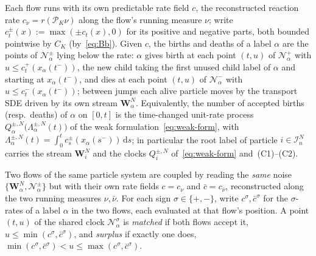 \documentclass[a4paper,fleqn]{cas-sc}
\theoremstyle{definition}
\theoremstyle{remark}
\begin{document}
Each flow runs with its own predictable rate field $c$, the reconstructed reaction rate
$c_\nu=r(\mathcal P_K\nu)$ along the flow's running measure $\nu$; write
$c^\pm_t(x):=\max(\pm c_t(x),0)$ for its positive and negative parts, both bounded
pointwise by $C_K$ (by~\eqref{eq:Bb}). Given $c$, the births and deaths of a label
$\alpha$ are the points of $\mathcal N^\pm_\alpha$ lying below the rate: $\alpha$ gives
birth at each point $(t,u)$ of $\mathcal N^{+}_\alpha$ with $u\le c^+_t(x_\alpha(t^-))$,
the new child taking the first unused child label of $\alpha$ and starting at
$x_\alpha(t^-)$, and dies at each point $(t,u)$ of $\mathcal N^{-}_\alpha$ with
$u\le c^-_t(x_\alpha(t^-))$; between jumps each alive particle moves by the transport SDE
driven by its own stream $\mathbf W^N_\alpha$. Equivalently, the number of accepted
births (resp.\ deaths) of $\alpha$ on $[0,t]$ is the time-changed unit-rate process
$Q^{\pm,N}_\alpha\!\bigl(\Lambda^{\pm,N}_\alpha(t)\bigr)$ of the weak
formulation~\eqref{eq:weak-form}, with
$\Lambda^{\pm,N}_\alpha(t)=\int_0^t c^\pm_s(x_\alpha(s^-))\,\mathrm ds$; in particular the
root label of particle $i\in\mathcal I^N_n$ carries the stream $\mathbf W^N_i$ and the
clocks $Q^{\pm,N}_i$ of~\eqref{eq:weak-form} and~(C1)--(C2).

Two flows of the same particle system are coupled by reading the \emph{same} noise
$\{\mathbf W^N_\alpha,\mathcal N^\pm_\alpha\}$ but with their own rate fields $c=c_\nu$ and
$\bar c=c_{\bar\nu}$, reconstructed along the two running measures $\nu,\bar\nu$. For each
sign $\sigma\in\{+,-\}$, write $c^\sigma,\bar c^\sigma$ for the $\sigma$-rates of a label
$\alpha$ in the two flows, each evaluated at that flow's position. A point $(t,u)$ of the
shared clock $\mathcal N^\sigma_\alpha$ is \emph{matched} if both flows accept it,
$u\le\min(c^\sigma,\bar c^\sigma)$, and \emph{surplus} if exactly one does,
$\min(c^\sigma,\bar c^\sigma)<u\le\max(c^\sigma,\bar c^\sigma)$.
\end{document}
